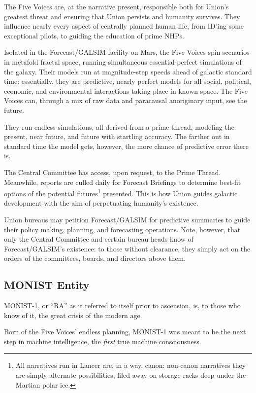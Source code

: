 The Five Voices are, at the narrative present, responsible both for Union's greatest threat and
ensuring that Union persists and humanity survives. They influence nearly every aspect of
centrally planned human life, from ID'ing some exceptional pilots, to guiding the education of
prime NHPs.

Isolated in the Forecast/GALSIM facility on Mars, the Five Voices spin scenarios in metafold
fractal space, running simultaneous essential-perfect simulations of the galaxy. Their models run
at magnitude-step speeds ahead of galactic standard time: essentially, they are predictive, nearly
perfect models for all social, political, economic, and environmental interactions taking place in
known space. The Five Voices can, through a mix of raw data and paracausal anoriginary input,
see the future.

They run endless simulations, all derived from a prime thread, modeling the present, near future,
and future with startling accuracy. The farther out in standard time the model gets, however, the
more chance of predictive error there is.

The Central Committee has access, upon request, to the Prime Thread. Meanwhile, reports are
culled daily for Forecast Briefings to determine best-fit options of the potential futures\footnote{All narratives run in Lancer are, in a way, canon: non-canon narratives they are simply alternate possibilities, filed away on storage racks deep under the Martian polar ice.}
presented. This is how Union guides galactic development with the aim of perpetuating
humanity's existence.

Union bureaus may petition Forecast/GALSIM for predictive summaries to guide their policy
making, planning, and forecasting operations. Note, however, that only the Central Committee
and certain bureau heads know of Forecast/GALSIM's existence: to those without clearance,
they simply act on the orders of the committees, boards, and directors above them.

\subsection{MONIST Entity}

MONIST-1, or ``RA'' as it referred to itself prior to ascension, is, to those who know of it, the great
crisis of the modern age.

Born of the Five Voices' endless planning, MONIST-1 was meant to be the next step in machine
intelligence, the \textit{first} true machine consciousness.


